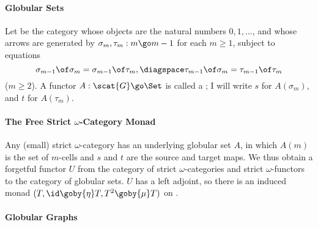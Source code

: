 
	\label{p:lprime}





\paragraph{Globular Sets}
 
Let  be the category whose objects are the natural numbers
$0,1,\ldots$, and whose arrows are generated by
$
\sigma_m, \tau_m: m \go m-1
$
for each $m\geq 1$, subject to equations
\[
\sigma_{m-1} \of \sigma_m = \sigma_{m-1} \of \tau_m,
\diagspace
\tau_{m-1} \of \sigma_m = \tau_{m-1} \of \tau_m
\]
($m\geq 2$).  A functor $A: \scat{G} \go \Set$ is called a ; I will write $s$ for $A(\sigma_m)$, and $t$ for $A(\tau_m)$. 

\paragraph{The Free Strict $\omega$-Category Monad}

Any (small) strict $\omega$-category has an underlying globular set $A$, in
which $A(m)$ is the set of $m$-cells and $s$ and $t$ are the source and
target maps.  We thus obtain a forgetful functor $U$ from the category of
strict $\omega$-categories and strict $\omega$-functors to the category
 of globular sets.  $U$ has a left adjoint, so there
is an induced monad $(T, \id \goby{\eta} T, T^2 \goby{\mu} T)$ on
.

\paragraph{Globular Graphs}

